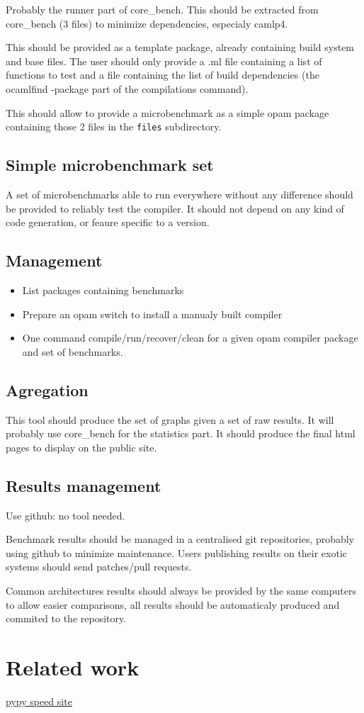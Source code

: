 \documentclass[11pt,a4paper]{article}
\begin{document}
Probably the runner part of core\_bench. This should be extracted from
core\_bench (3 files) to minimize dependencies, especialy camlp4.

This should be provided as a template package, already containing
build system and base files. The user should only provide a .ml file
containing a list of functions to test and a file containing the list
of build dependencies (the ocamlfind -package part of the compilations
command).

This should allow to provide a microbenchmark as a simple opam package
containing those 2 files in the \texttt{files} subdirectory.

\subsection{Simple microbenchmark set}

A set of microbenchmarks able to run everywhere without any difference
should be provided to reliably test the compiler. It should not depend
on any kind of code generation, or feaure specific to a version.

\subsection{Management}

\begin{itemize}
\item List packages containing benchmarks
\item Prepare an opam switch to install a manualy built compiler
\item One command compile/run/recover/clean for a given opam compiler
  package and set of benchmarks.
\end{itemize}

\subsection{Agregation}

This tool should produce the set of graphs given a set of raw
results. It will probably use core\_bench for the statistics part. It
should produce the final html pages to display on the public site.

\subsection{Results management}

Use github: no tool needed.

Benchmark results should be managed in a centralised git repositories,
probably using github to minimize maintenance. Users publishing
results on their exotic systems should send patches/pull requests.

Common architectures results should always be provided by the same
computers to allow easier comparisons, all results should be
automaticaly produced and commited to the repository.

\section{Related work}

\href{http://speed.pypy.org/}{pypy speed site}
\end{document}
